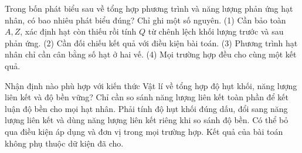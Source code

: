\begin{ex}
Trong bốn phát biểu sau về tổng hợp phương trình và năng lượng phản ứng hạt nhân, có bao nhiêu phát biểu đúng? Chỉ ghi một số nguyên. (1) Cần bảo toàn $A,Z$, xác định hạt còn thiếu rồi tính $Q$ từ chênh lệch khối lượng trước và sau phản ứng. (2) Cần đối chiếu kết quả với điều kiện bài toán. (3) Phương trình hạt nhân chỉ cần cân bằng số hạt ở hai vế. (4) Mọi trường hợp đều cho cùng một kết quả.
\end{ex}

\begin{ex}
Nhận định nào phù hợp với kiến thức Vật lí về tổng hợp độ hụt khối, năng lượng liên kết và độ bền vững?
\choice
{Chỉ cần so sánh năng lượng liên kết toàn phần để kết luận độ bền cho mọi hạt nhân.}
{\True Phải tính độ hụt khối đúng dấu, đổi sang năng lượng liên kết và dùng năng lượng liên kết riêng khi so sánh độ bền.}
{Có thể bỏ qua điều kiện áp dụng và đơn vị trong mọi trường hợp.}
{Kết quả của bài toán không phụ thuộc dữ kiện đã cho.}
\end{ex}

